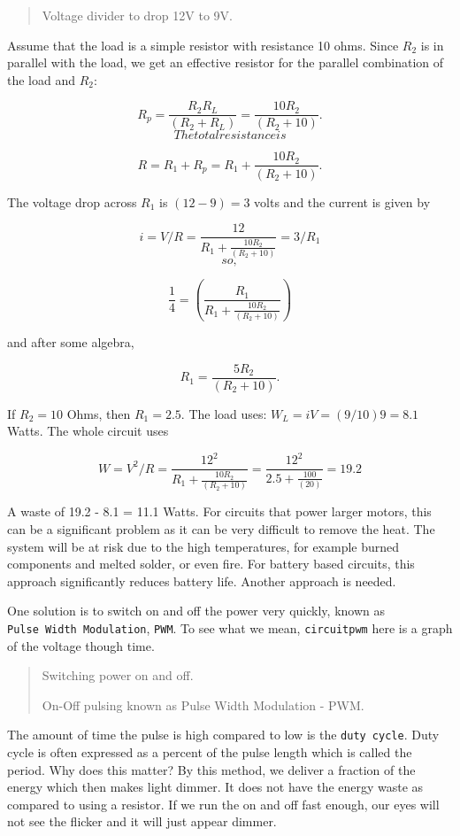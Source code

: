 \begin{quote}
Voltage divider to drop 12V to 9V.
\end{quote}

Assume that the load is a simple resistor with resistance 10 ohms. Since
\(R_2\) is in parallel with the load, we get an effective resistor for
the parallel combination of the load and \(R_2\):

\[\displaystyle  R_p = \frac{R_2R_L }{(R_2 + R_L)}= \frac{10R_2 }{(R_2 + 10)}.\]\[The total resistance is\]

\[R =  R_1 + R_p = R_1 + \frac{10R_2 }{(R_2 + 10)}.\]

The voltage drop across \(R_1\) is \((12-9)=3\) volts and the current is
given by

\[i = V/R = \displaystyle \frac{12}{R_1 + \frac{10R_2 }{(R_2 + 10)}} = 3/R_1\]\[so,\]

\[\displaystyle \frac{1}{4} = \left( \frac{R_1}{R_1 + \frac{10R_2}{(R_2 + 10)}}\right)\]

and after some algebra,

\[R_1 =\displaystyle \frac{5R_2}{(R_2 + 10)}.\]

If \(R_2 = 10\) Ohms, then \(R_1 = 2.5\). The load uses:
\(W_L = iV = (9/10)9 = 8.1\) Watts. The whole circuit uses

\[W = V^2/R = \displaystyle\frac{12^2}{R_1 + \frac{10R_2}{(R_2 + 10)}} = \displaystyle
 \frac{12^2}{2.5 + \frac{100}{(20)}} = 19.2\]

A waste of 19.2 - 8.1 = 11.1 Watts. For circuits that power larger
motors, this can be a significant problem as it can be very difficult to
remove the heat. The system will be at risk due to the high
temperatures, for example burned components and melted solder, or even
fire. For battery based circuits, this approach significantly reduces
battery life. Another approach is needed.

One solution is to switch on and off the power very quickly, known as
\texttt{Pulse\ Width\ Modulation}, \texttt{PWM}. To see what we mean,
\texttt{circuitpwm} here is a graph of the voltage though time.

\begin{quote}
Switching power on and off.

On-Off pulsing known as Pulse Width Modulation - PWM.
\end{quote}

The amount of time the pulse is high compared to low is the
\texttt{duty\ cycle}. Duty cycle is often expressed as a percent of the
pulse length which is called the period. Why does this matter? By this
method, we deliver a fraction of the energy which then makes light
dimmer. It does not have the energy waste as compared to using a
resistor. If we run the on and off fast enough, our eyes will not see
the flicker and it will just appear dimmer.

